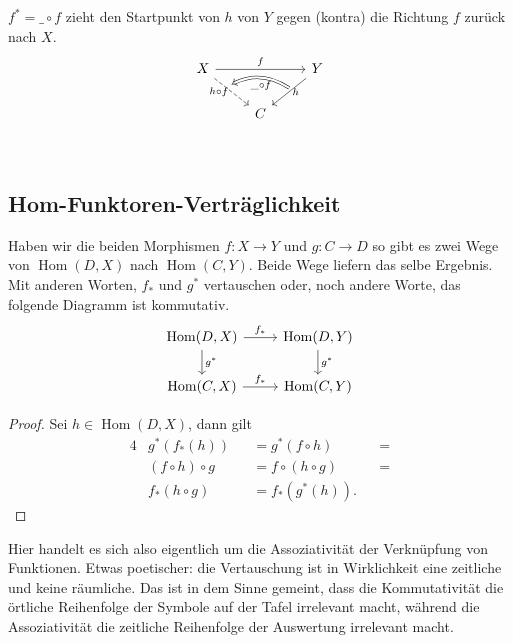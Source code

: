 \documentclass[a4paper]{amsart}
\theoremstyle{definition}
\DeclareMathOperator{\Hom}{Hom}
\begin{document}
$f^* = \_ \circ f$ zieht den Startpunkt von $h$ von $Y$ gegen (kontra) die Richtung $f$ zurück nach $X$.
\begin{equation}
   \begin{tikzcd}
      X \arrow[rr, "f"{above}] \arrow[dr, dashed, "h \circ f"{left, name=1}] &   
                            &Y \arrow[dl, , "h"{right,name=0}]\\
      &C     \\
      \arrow[Rightarrow, bend right, from=0, to=1, "\_ \circ f"{below}]
   \end{tikzcd}
\end{equation}

\subsection{Hom-Funktoren-Verträglichkeit}
Haben wir die beiden Morphismen $f \colon X \to Y$ und $g \colon C \to D$ so gibt es zwei Wege von $\Hom(D,X)$ nach $\Hom(C,Y)$. Beide Wege liefern das selbe Ergebnis. Mit anderen Worten, $f_*$ und $g^*$ vertauschen oder, noch andere Worte, das folgende Diagramm ist kommutativ.
\begin{equation}
   \begin{tikzcd}
      \Hom(D,X)   \arrow[d, "g^*"]  \arrow[r, "f_*"] & \Hom(D,Y) \arrow[d, "g^*"]\\
      \Hom(C,X)                     \arrow[r, "f_*"] & \Hom(C,Y)
   \end{tikzcd}
\end{equation}
\begin{proof}
   Sei $h\in \Hom(D,X)$, dann gilt
   \begin{alignat}{4}
      &g^*(f_*(h))         &&= g^*(f \circ h)      &&= \\
      &(f \circ h) \circ g &&= f \circ (h \circ g) &&=\\
      &f_*(h \circ g)      &&= f_*(g^*(h)).
   \end{alignat}
\end{proof}
Hier handelt es sich also eigentlich um die Assoziativität der Verknüpfung von Funktionen. Etwas poetischer: die Vertauschung ist in Wirklichkeit eine zeitliche und keine räumliche. Das ist in dem Sinne gemeint, dass die Kommutativität die örtliche Reihenfolge der Symbole auf der Tafel irrelevant macht, während die Assoziativität die zeitliche Reihenfolge der Auswertung irrelevant macht. 
\end{document}
